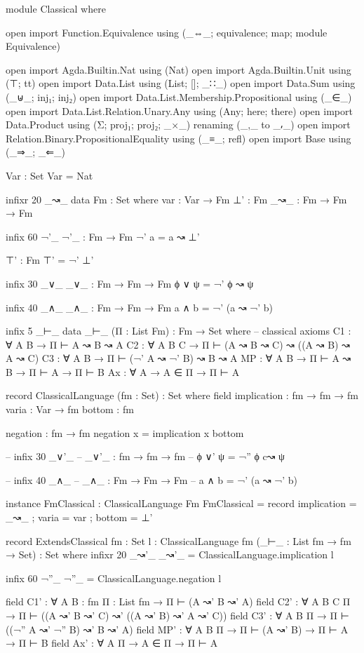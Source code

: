 \begin{spverbatim}
module Classical where

open import Function.Equivalence using (_⇔_; equivalence; map; module Equivalence)

open import Agda.Builtin.Nat using (Nat)
open import Agda.Builtin.Unit using (⊤; tt)
open import Data.List using (List; []; _∷_)
open import Data.Sum using (_⊎_; inj₁; inj₂)
open import Data.List.Membership.Propositional using (_∈_)
open import Data.List.Relation.Unary.Any using (Any; here; there)
open import Data.Product using (Σ; proj₁; proj₂; _×_) renaming (_,_ to _⸴_)
open import Relation.Binary.PropositionalEquality using (_≡_; refl)
open import Base using (_⇒_; _⇐_)

Var : Set
Var = Nat

infixr 20 _↝_
data Fm : Set where
  var : Var → Fm
  ⊥' : Fm
  _↝_ : Fm → Fm → Fm

infix 60 ¬'_
¬'_ : Fm → Fm
¬' a = a ↝ ⊥'

⊤' : Fm
⊤' = ¬' ⊥'

infix 30 _∨_
_∨_ : Fm → Fm → Fm
ϕ ∨ ψ = ¬' ϕ ↝ ψ

infix 40 _∧_
_∧_ : Fm → Fm → Fm
a ∧ b = ¬' (a ↝ ¬' b)

infix 5 _⊢_
data _⊢_ (Π : List Fm) : Fm → Set where
  -- classical axioms
  C1 : ∀ {A B} → Π ⊢ A ↝ B ↝ A
  C2 : ∀ {A B C} → Π ⊢ (A ↝ B ↝ C) ↝ ((A ↝ B) ↝ A ↝ C)
  C3 : ∀ {A B} → Π ⊢ (¬' A ↝ ¬' B) ↝ B ↝ A
  MP : ∀ {A B} → Π ⊢ A ↝ B → Π ⊢ A → Π ⊢ B
  Ax : ∀ {A} → A ∈ Π → Π ⊢ A


record ClassicalLanguage (fm : Set) : Set where
  field
    implication : fm → fm → fm
    varia : Var → fm
    bottom : fm


  negation : fm → fm
  negation x = implication x bottom

  -- infix 30 _∨'_
  -- _∨'_ : fm → fm → fm
  -- ϕ ∨' ψ = ¬'' ϕ c↝ ψ

  -- infix 40 _∧_
  -- _∧_ : Fm → Fm → Fm
  -- a ∧ b = ¬' (a ↝ ¬' b)

instance
  FmClassical : ClassicalLanguage Fm
  FmClassical = record { implication = _↝_ ; varia = var ; bottom = ⊥' }


record ExtendsClassical {fm : Set} {{l : ClassicalLanguage fm}} (_⊢_ : List fm → fm → Set) : Set where
    infixr 20 _↝'_
    _↝'_ = ClassicalLanguage.implication l

    infix 60 ¬''_
    ¬''_ = ClassicalLanguage.negation l

    field C1' : ∀ {A B : fm} {Π : List fm} → Π ⊢ (A ↝' B ↝' A)
    field C2' : ∀ {A B C Π} → Π ⊢ ((A ↝' B ↝' C) ↝' ((A ↝' B) ↝' A ↝' C))
    field C3' : ∀ {A B Π} → Π ⊢ ((¬'' A ↝' ¬'' B) ↝' B ↝' A)
    field MP' : ∀ {A B Π} → Π ⊢ (A ↝' B) → Π ⊢ A → Π ⊢ B
    field Ax' : ∀ {A Π} → A ∈ Π → Π ⊢ A


\end{spverbatim}
